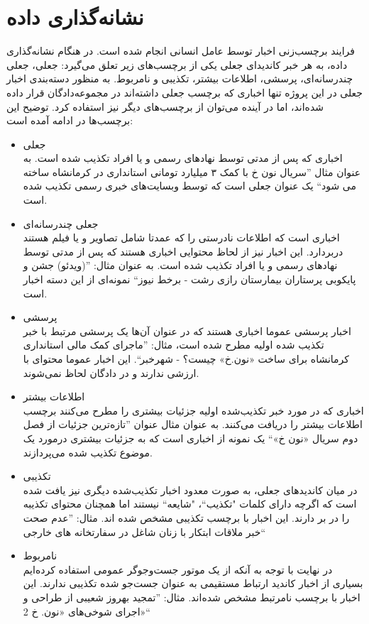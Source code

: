 \section{نشانه‌گذاری داده}
فرایند برچسب‌زنی اخبار توسط عامل انسانی انجام شده ‌است.  در هنگام نشانه‌گذاری داده، به هر خبر کاندیدای جعلی یکی از برچسب‌های زیر تعلق می‌گیرد: جعلی، جعلی چندرسانه‌ای، پرسشی، اطلاعات بیشتر، تکذیبی و نامربوط. به منظور دسته‌بندی اخبار جعلی در این پروژه تنها اخباری که برچسب جعلی داشته‌اند در مجموعه‌دادگان قرار داده شده‌اند، اما در آینده می‌توان از برچسب‌های دیگر نیز استفاده کرد. توضیح این برچسب‌ها در ادامه آمده است:
\begin{itemize}
\item جعلی \\
اخباری که پس از مدتی توسط نهاد‌های رسمی و یا افراد تکذیب شده است. به عنوان مثال ''سریال نون خ با کمک ۳ میلیارد تومانی استانداری در کرمانشاه ساخته می شود`` یک عنوان جعلی است که توسط وبسایت‌های خبری رسمی تکذیب شده است.

\item جعلی چندرسانه‌ای \\
اخباری است که اطلاعات نادرستی را که عمدتا شامل تصاویر و یا فیلم هستند دربردارد. 
این اخبار نیز از لحاظ محتوایی اخباری هستند که پس از مدتی توسط نهاد‌های رسمی و یا افراد تکذیب شده است.
به عنوان مثال: ''(ویدئو) جشن و پایکوبی پرستاران بیمارستان رازی رشت - برخط نیوز`` نمونه‌ای از این دسته اخبار است.

\item پرسشی \\
اخبار پرسشی عموما اخباری هستند که در عنوان‌ آن‌ها یک پرسشی مرتبط با خبر تکذیب شده اولیه مطرح شده است، مثال: ''ماجرای کمک مالی استانداری کرمانشاه برای ساخت «نون‌.خ» چیست؟ - شهرخبر``. این اخبار عموما محتوای با ارزشی ندارند و در دادگان لحاظ نمی‌شوند.

\item اطلاعات بیشتر \\
اخباری که در مورد خبر تکذیب‌شده اولیه جزئیات بیشتری را مطرح می‌کنند برچسب اطلاعات بیشتر را دریافت می‌کنند. به عنوان مثال عنوان ''تازه‌ترین جزئیات از فصل دوم سریال «نون خ»`` یک نمونه از اخباری است که به جزئیات بیشتری درمورد یک موضوع تکذیب شده می‌پردازند.
\item تکذیبی \\
در میان کاندید‌های جعلی، به صورت معدود اخبار تکذیب‌شده دیگری نیز یافت شده است که اگرچه دارای کلمات "تکذیب``، "شایعه`` نیستند اما همچنان محتوای تکذیبه را در بر دارند. این اخبار با برچسب تکذیبی مشخص شده اند. مثال: ''عدم صحت خبر ملاقات ابتكار با زنان شاغل در سفارتخانه های خارجی``

\item نامربوط \\
در نهایت با توجه به آنکه از یک موتور جست‌و‌جوگر عمومی استفاده کرده‌ایم بسیاری از اخبار کاندید ارتباط مستقیمی به عنوان جست‌جو شده تکذیبی ندارند. این اخبار با برچسب نامرتبط مشخص شده‌اند. مثال: ''تمجید بهروز شعیبی از طراحی و اجرای شوخی‌های «نون. خ 2»``

\end{itemize}

